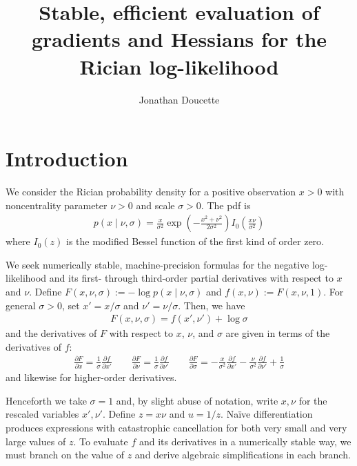 \documentclass{article}
\title{Stable, efficient evaluation of gradients and Hessians for the Rician log-likelihood}
\author{Jonathan Doucette}
\begin{document}
\maketitle

\section{Introduction}

We consider the Rician probability density for a positive observation $x>0$ with noncentrality parameter $\nu>0$ and scale $\sigma>0$.
The pdf is
%
\begin{align}
  p(x\mid\nu,\sigma) = \frac{x}{\sigma^2} \exp\left(-\frac{x^2+\nu^2}{2\sigma^2}\right) I_0\left(\frac{x\nu}{\sigma^2}\right)
\end{align}
%
where $I_0(z)$ is the modified Bessel function of the first kind of order zero.

We seek numerically stable, machine-precision formulas for the negative log-likelihood and its first- through third-order partial derivatives with respect to $x$ and $\nu$.
Define $F(x,\nu,\sigma) := -\log p(x\mid\nu,\sigma)$ and $f(x,\nu) := F(x,\nu,1)$.
For general $\sigma>0$, set $x'=x/\sigma$ and $\nu'=\nu/\sigma$.
Then, we have
%
\begin{align}
  F(x,\nu,\sigma) = f(x',\nu') + \log\sigma
\end{align}
%
and the derivatives of $F$ with respect to $x$, $\nu$, and $\sigma$ are given in terms of the derivatives of $f$:
%
\begin{align}
  \frac{\partial F}{\partial x}      = \frac{1}{\sigma} \frac{\partial f}{\partial x'}                                                                                        \qquad
  \frac{\partial F}{\partial \nu}    = \frac{1}{\sigma} \frac{\partial f}{\partial \nu'}                                                                                      \qquad
  \frac{\partial F}{\partial \sigma} = -\frac{x}{\sigma^2} \frac{\partial f}{\partial x'} - \frac{\nu}{\sigma^2} \frac{\partial f}{\partial \nu'} + \frac{1}{\sigma}
\end{align}
%
and likewise for higher-order derivatives.

Henceforth we take $\sigma=1$ and, by slight abuse of notation, write $x,\nu$ for the rescaled variables $x',\nu'$.
Define $z=x\nu$ and $u=1/z$.
Na\"ive differentiation produces expressions with catastrophic cancellation for both very small and very large values of $z$.
To evaluate $f$ and its derivatives in a numerically stable way, we must branch on the value of $z$ and derive algebraic simplifications in each branch.
\end{document}
